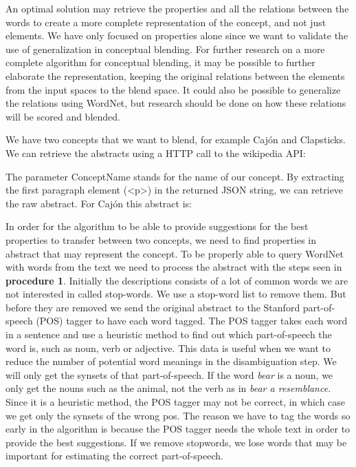 An optimal solution may retrieve the properties and all the relations between the words to create a more complete representation of the concept, and not just elements. We have only focused on properties alone since we want to validate the use of generalization in conceptual blending. For further research on a more complete algorithm for conceptual blending, it may be possible to further elaborate the representation, keeping the original relations between the elements from the input spaces to the blend space. It could also be possible to generalize the relations using WordNet, but research should be done on how these relations will be scored and blended.

We have two concepts that we want to blend, for example Cajón and Clapsticks.
We can retrieve the abstracts using a HTTP call to the wikipedia API:

\noindent{}
The parameter ConceptName stands for the name of our concept. By extracting the first paragraph element (<p>) in the returned JSON string, we can retrieve the raw abstract. For Cajón this abstract is:
 
\noindent{}

In order for the algorithm to be able to provide suggestions for the best properties to transfer between two concepts, we need to find properties in abstract that may represent the concept. To be properly able to query WordNet with words from the text we need to process the abstract with the steps seen in \textbf{procedure 1}. Initially the descriptions consists of a lot of common words we are not interested in called stop-words. We use a stop-word list to remove them. But before they are removed we send the original abstract to the Stanford part-of-speech (POS) tagger to have each word tagged. The POS tagger takes each word in a sentence and use a heuristic method to find out which part-of-speech the word is, such as noun, verb or adjective. This data is useful when we want to reduce the number of potential word meanings in the disambiguation step. We will only get the synsets of that part-of-speech. If the word \emph{bear} is a noun, we only get the nouns such as the animal, not the verb as in \emph{bear a resemblance}. Since it is a heuristic method, the POS tagger may not be correct, in which case we get only the synsets of the wrong pos. The reason we have to tag the words so early in the algorithm is because the POS tagger needs the whole text in order to provide the best suggestions. If we remove stopwords, we lose words that may be important for estimating the correct part-of-speech. 

